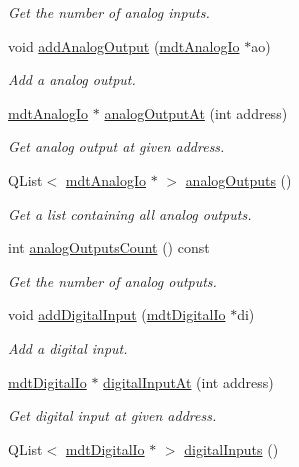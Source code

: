 \begin{DoxyCompactItemize}
\begin{DoxyCompactList}\small\item\em Get the number of analog inputs. \end{DoxyCompactList}\item 
void \hyperlink{classmdt_device_ios_aeed1140ed869866a6edc738d3b2a6d0b}{addAnalogOutput} (\hyperlink{classmdt_analog_io}{mdtAnalogIo} $\ast$ao)
\begin{DoxyCompactList}\small\item\em Add a analog output. \end{DoxyCompactList}\item 
\hyperlink{classmdt_analog_io}{mdtAnalogIo} $\ast$ \hyperlink{classmdt_device_ios_a70eba4430604bc30841ddb72664a0e98}{analogOutputAt} (int address)
\begin{DoxyCompactList}\small\item\em Get analog output at given address. \end{DoxyCompactList}\item 
\hypertarget{classmdt_device_ios_aa53fc12adeac76a039f005e72776362c}{
QList$<$ \hyperlink{classmdt_analog_io}{mdtAnalogIo} $\ast$ $>$ \hyperlink{classmdt_device_ios_aa53fc12adeac76a039f005e72776362c}{analogOutputs} ()}
\label{classmdt_device_ios_aa53fc12adeac76a039f005e72776362c}

\begin{DoxyCompactList}\small\item\em Get a list containing all analog outputs. \end{DoxyCompactList}\item 
\hypertarget{classmdt_device_ios_a8b9b14c4968e5aaae60ac7f91f77e06c}{
int \hyperlink{classmdt_device_ios_a8b9b14c4968e5aaae60ac7f91f77e06c}{analogOutputsCount} () const }
\label{classmdt_device_ios_a8b9b14c4968e5aaae60ac7f91f77e06c}

\begin{DoxyCompactList}\small\item\em Get the number of analog outputs. \end{DoxyCompactList}\item 
void \hyperlink{classmdt_device_ios_a023571f5d77bd0874c08b53890a56381}{addDigitalInput} (\hyperlink{classmdt_digital_io}{mdtDigitalIo} $\ast$di)
\begin{DoxyCompactList}\small\item\em Add a digital input. \end{DoxyCompactList}\item 
\hyperlink{classmdt_digital_io}{mdtDigitalIo} $\ast$ \hyperlink{classmdt_device_ios_a78f68d0efeac0a23628f133121f28df8}{digitalInputAt} (int address)
\begin{DoxyCompactList}\small\item\em Get digital input at given address. \end{DoxyCompactList}\item 
\hypertarget{classmdt_device_ios_ab70374d3ad06739f91388526d4203def}{
QList$<$ \hyperlink{classmdt_digital_io}{mdtDigitalIo} $\ast$ $>$ \hyperlink{classmdt_device_ios_ab70374d3ad06739f91388526d4203def}{digitalInputs} ()}
\label{classmdt_device_ios_ab70374d3ad06739f91388526d4203def}


\end{DoxyCompactItemize}
